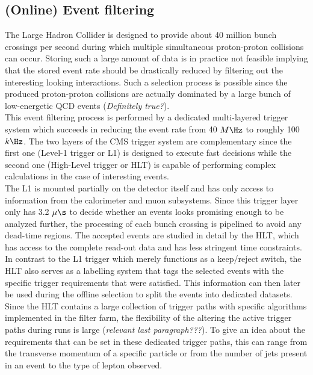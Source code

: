 \subsection{(Online) Event filtering}
The Large Hadron Collider is designed to provide about 40 million bunch crossings per second during which multiple simultaneous proton-proton collisions can occur. Storing such a large amount of data is in practice not feasible implying that the stored event rate should be drastically reduced by filtering out the interesting looking interactions. Such a selection process is possible since the produced proton-proton collisions are actually dominated by a large bunch of low-energetic QCD events (\textit{Definitely true?}).
\\
This event filtering process is performed by a dedicated multi-layered trigger system which succeeds in reducing the event rate from 40 $M\Hz$ to roughly 100 $k\Hz$. The two layers of the CMS trigger system are complementary since the first one (Level-1 trigger or L1) is designed to execute fast decisions while the second one (High-Level trigger or HLT) is capable of performing complex calculations in the case of interesting events.
\\
The L1 is mounted partially on the detector itself and has only access to information from the calorimeter and muon subsystems. Since this trigger layer only has 3.2 $\mu\s$ to decide whether an events looks promising enough to be analyzed further, the processing of each bunch crossing is pipelined to avoid any dead-time regions. The accepted events are studied in detail by the HLT, which has access to the complete read-out data and has less stringent time constraints. In contrast to the L1 trigger which merely functions as a keep/reject switch, the HLT also serves as a labelling system that tags the selected events with the specific trigger requirements that were satisfied. This information can then later be used during the offline selection to split the events into dedicated datasets.
\\
Since the HLT contains a large collection of trigger paths with specific algorithms implemented in the filter farm, the flexibility of the altering the active trigger paths during runs is large (\textit{relevant last paragraph???}). To give an idea about the requirements that can be set in these dedicated trigger paths, this can range from the transverse momentum of a specific particle or from the number of jets present in an event to the type of lepton observed.
\\

